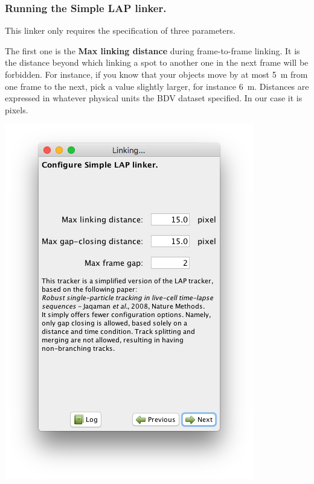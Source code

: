 \subsubsection{Running the Simple LAP linker.}

This linker only requires the specification of three parameters.

The first one is the \textbf{Max linking distance} during frame-to-frame linking. 
It is the distance beyond which linking a spot to another one in the next frame will be forbidden. 
For instance, if you know that your objects move by at most 5~{\textmu}m from one frame to the next, pick a value slightly larger, for instance 6~{\textmu}m.
Distances are expressed in whatever physical units the BDV dataset specified.
In our case it is pixels. 

\begin{center}
    \includegraphics[height=0.25\textheight,trim=0.5cm .5cm .5cm .5cm,clip]{figures/Mastodon_LinkingWizard_03.png}
\end{center}


